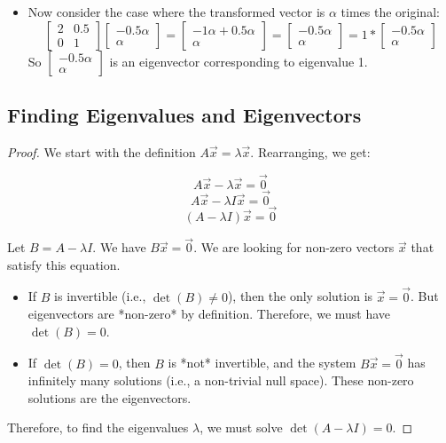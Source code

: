 \documentclass{report}
\begin{document}
{\begin{itemize}
		\item Now consider the case where the transformed vector is $\alpha$ times the original:
		      \[\begin{bmatrix} 2 & 0.5 \\ 0 & 1 \end{bmatrix} \begin{bmatrix} -0.5\alpha \\ \alpha \end{bmatrix} =
			      \begin{bmatrix} -1\alpha + 0.5\alpha \\ \alpha \end{bmatrix} =
			      \begin{bmatrix} -0.5\alpha \\ \alpha \end{bmatrix} = 1 * \begin{bmatrix} -0.5\alpha \\ \alpha \end{bmatrix}\]
		      So $\begin{bmatrix} -0.5\alpha \\ \alpha \end{bmatrix}$ is an eigenvector corresponding to eigenvalue 1.

	\end{itemize}
}

\subsection*{Finding Eigenvalues and Eigenvectors}

\begin{proof}
	We start with the definition $A\vec{x} = \lambda\vec{x}$.  Rearranging, we get:

	\[A\vec{x} - \lambda\vec{x} = \vec{0}\]
	\[A\vec{x} - \lambda I\vec{x} = \vec{0}\]
	\[(A - \lambda I)\vec{x} = \vec{0}\]

	Let $B = A - \lambda I$.  We have $B\vec{x} = \vec{0}$.  We are looking for non-zero vectors $\vec{x}$ that satisfy this equation.

	\begin{itemize}
		\item If $B$ is invertible (i.e., $\det(B) \neq 0$), then the only solution is $\vec{x} = \vec{0}$.  But eigenvectors are *non-zero* by definition.  Therefore, we must have $\det(B) = 0$.
		\item If $\det(B) = 0$, then $B$ is *not* invertible, and the system $B\vec{x} = \vec{0}$ has infinitely many solutions (i.e., a non-trivial null space). These non-zero solutions are the eigenvectors.
	\end{itemize}

	Therefore, to find the eigenvalues $\lambda$, we must solve $\det(A - \lambda I) = 0$.
\end{proof}
\end{document}

